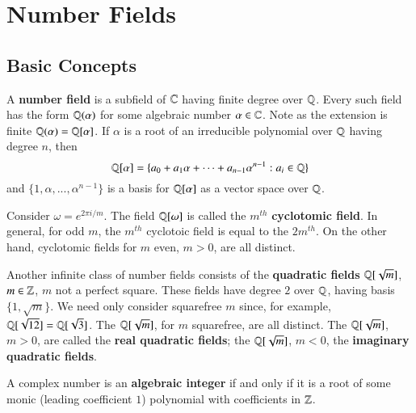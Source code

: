 %
%
%
\chapter{Number Fields}
\label{Numb} %




\section{Basic Concepts}
\label{sec:BC1}

A \textbf{number field} is a subfield of $\mathbb C$ having finite degree over $\mathbb Q$. Every such field has the form $\mathbb Q(\alpha)$ for some algebraic number $\alpha \in \mathbb C$. Note as the extension is finite $\mathbb Q(\alpha) = \mathbb Q[\alpha]$. If $\alpha$ is a root of an irreducible polynomial over $\mathbb Q$ having degree $n$, then $$\mathbb Q[\alpha] = \{a_0+a_1\alpha+\cdots+a_{n-1}\alpha^{n-1}:a_i \in \mathbb Q\}$$
and $\{1,\alpha,...,\alpha^{n-1}\}$ is a basis for $\mathbb Q[\alpha]$ as a vector space over $\mathbb Q$.

Consider $\omega = e^{2\pi i/m}$. The field $\mathbb Q[\omega]$ is called the $m^{th}$ \textbf{cyclotomic field}. In general, for odd $m$, the $m^{th}$ cyclotoic field is equal to the $2m^{th}$. On the other hand, cyclotomic fields for $m$ even, $m > 0$, are all distinct.

Another infinite class of number fields consists of the \textbf{quadratic fields} $\mathbb Q[\sqrt{m}]$, $m \in \mathbb Z$, $m$ not a perfect square. These fields have degree $2$ over $\mathbb Q$, having basis $\{1,\sqrt{m}\}$. We need only consider squarefree $m$ since, for example, $\mathbb Q[\sqrt{12}] = \mathbb Q[\sqrt{3}]$. The $\mathbb Q[\sqrt{m}]$, for $m$ squarefree, are all distinct. The $\mathbb Q[\sqrt{m}]$, $m > 0$, are called the \textbf{real quadratic fields}; the $\mathbb Q[\sqrt{m}]$, $m < 0$, the \textbf{imaginary quadratic fields}.

\begin{defn}
    A complex number is an \textbf{algebraic integer} if and only if it is a root of some monic (leading coefficient $1$) polynomial with coefficients in $\mathbb Z$.
\end{defn}

